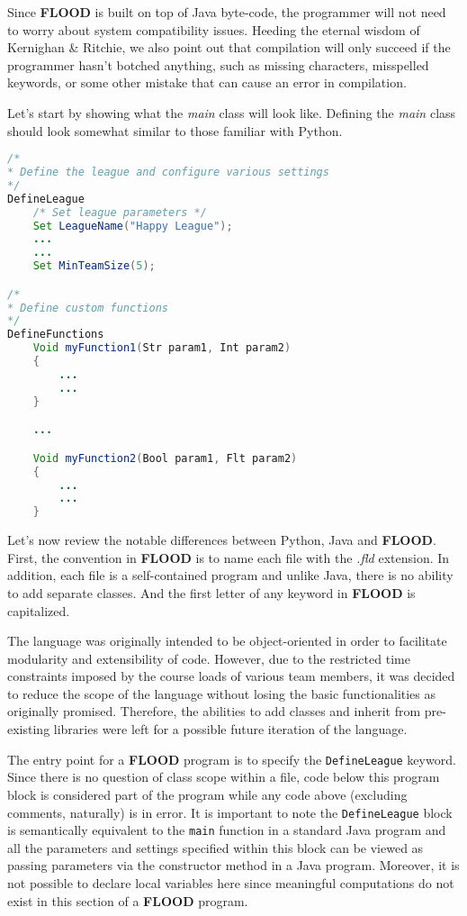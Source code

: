 \documentclass[12pt]{report}
\begin{document}
Since \textbf{FLOOD} is built on top of Java byte-code, the programmer will not need to worry about system compatibility issues. Heeding the eternal wisdom of Kernighan \& Ritchie, we also point out that compilation will only succeed if the programmer hasn't botched anything, such as missing characters, misspelled keywords, or some other mistake that can cause an error in compilation. 

Let's start by showing what the \textit{main} class will look like. Defining the \textit{main} class should look somewhat similar to those familiar with Python.

\begin{singlespace}
\begin{lstlisting}[language=Java,label=some-code,caption=Sample.fld]
/*
* Define the league and configure various settings
*/
DefineLeague
	/* Set league parameters */
	Set LeagueName("Happy League");
	...
	...
	Set MinTeamSize(5);

/*
* Define custom functions
*/
DefineFunctions
	Void myFunction1(Str param1, Int param2)
	{
		...
		...
	}

	...

	Void myFunction2(Bool param1, Flt param2)
	{
		...
		...
	}
\end{lstlisting}
\end{singlespace}

Let's now review the notable differences between Python, Java and \textbf{FLOOD}. First,  the convention in \textbf{FLOOD} is to name each file with the \textit{.fld} extension. In addition, each file is a self-contained program and unlike Java, there is no ability to add separate classes. And the first letter of any keyword in \textbf{FLOOD} is capitalized.

The language was originally intended to be object-oriented in order to facilitate modularity and extensibility of code. However, due to the restricted time constraints imposed by the course loads of various team members, it was decided to reduce the scope of the language without losing the basic functionalities as originally promised. Therefore, the abilities to add classes and inherit from pre-existing libraries were left for a possible future iteration of the language. 

The entry point for a \textbf{FLOOD} program is to specify the \texttt{DefineLeague} keyword. Since there is no question of class scope within a file, code below this program block is considered part of the program while any code above (excluding comments, naturally) is in error. It is important to note the \texttt{DefineLeague} block is semantically equivalent to the \texttt{main} function in a standard Java program and all the parameters and settings specified within this block can be viewed as passing parameters via the constructor method in a Java program. Moreover, it is not possible to declare local variables here since meaningful computations do not exist in this section of a \textbf{FLOOD} program. 
\end{document}

